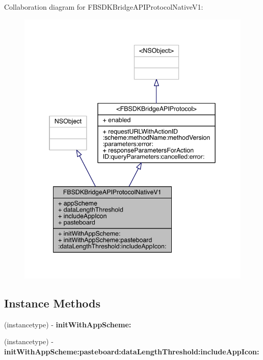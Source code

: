 Collaboration diagram for F\-B\-S\-D\-K\-Bridge\-A\-P\-I\-Protocol\-Native\-V1\-:
\nopagebreak
\begin{figure}[H]
\begin{center}
\leavevmode
\includegraphics[width=342pt]{interface_f_b_s_d_k_bridge_a_p_i_protocol_native_v1__coll__graph}
\end{center}
\end{figure}
\subsection*{Instance Methods}
\begin{DoxyCompactItemize}
\item 
\hypertarget{interface_f_b_s_d_k_bridge_a_p_i_protocol_native_v1_aeca1b98363dc64e60f45f8c859c2b5b8}{(instancetype) -\/ {\bfseries init\-With\-App\-Scheme\-:}}\label{interface_f_b_s_d_k_bridge_a_p_i_protocol_native_v1_aeca1b98363dc64e60f45f8c859c2b5b8}

\item 
\hypertarget{interface_f_b_s_d_k_bridge_a_p_i_protocol_native_v1_a40db3edd2edc45be08492d9cc8ebea93}{(instancetype) -\/ {\bfseries init\-With\-App\-Scheme\-:pasteboard\-:data\-Length\-Threshold\-:include\-App\-Icon\-:}}\label{interface_f_b_s_d_k_bridge_a_p_i_protocol_native_v1_a40db3edd2edc45be08492d9cc8ebea93}

\end{DoxyCompactItemize}
